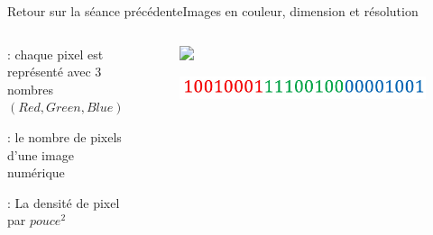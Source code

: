 \documentclass{beamer}
\begin{document}
\begin{frame}{Retour sur la séance précédente}{Images en couleur, dimension et résolution}
	\begin{columns}
		\begin{column}{0.6\textwidth}
			\begin{description}
				\item[Couleurs] : chaque pixel est représenté avec 3 nombres $(Red, Green, Blue)$
					\item<2->[Dimension] : le nombre de pixels d'une image numérique
					\item<3->[Résolution] : La densité de pixel par $pouce^{2}$
			\end{description}
		\end{column}
		\begin{column}{0.4\textwidth}
			\begin{figure}
				\includegraphics<2->[width=1\linewidth]{dimension-image.jpg}
			\end{figure}
			\begin{figure}
				\includegraphics[width=1\linewidth]{binaire-pixel-couleur.jpeg}
			\end{figure}
		\end{column}
	\end{columns}
\end{frame}
\end{document}
